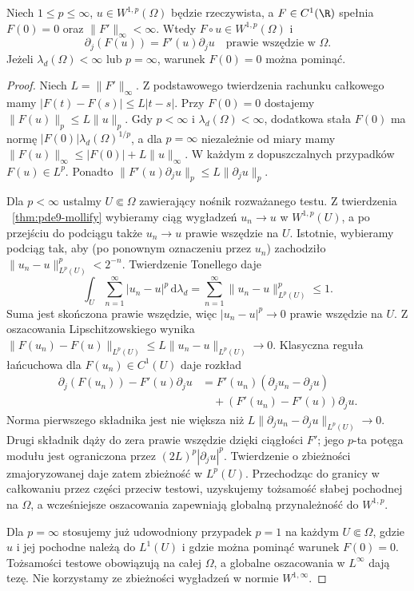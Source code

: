\begin{twierdzenie}
\label{thm:pde9-chain}
Niech $1\le p\le\infty$, $u\in W^{1,p}(\Omega)$
będzie rzeczywista, a $F\in C^1(\R)$ spełnia
$F(0)=0$ oraz $\|F'\|_\infty<\infty$.
Wtedy $F\circ u\in W^{1,p}(\Omega)$ i
\[
 \partial_j(F(u))=F'(u)\partial_j u
 \quad\text{prawie wszędzie w }\Omega.
\]
Jeżeli $\lambda_d(\Omega)<\infty$ lub $p=\infty$,
warunek $F(0)=0$ można pominąć.
\end{twierdzenie}
\begin{proof}
Niech $L=\|F'\|_\infty$. Z podstawowego twierdzenia
rachunku całkowego mamy $|F(t)-F(s)|\le L|t-s|$.
Przy $F(0)=0$ dostajemy $\|F(u)\|_p\le L\|u\|_p$.
Gdy $p<\infty$ i $\lambda_d(\Omega)<\infty$,
dodatkowa stała $F(0)$ ma normę
$|F(0)|\lambda_d(\Omega)^{1/p}$, a dla $p=\infty$
niezależnie od miary mamy $\|F(u)\|_\infty
\le |F(0)|+L\|u\|_\infty$.
W każdym z dopuszczalnych przypadków $F(u)\in L^p$.
Ponadto $\|F'(u)\partial_j u\|_p\le L\|\partial_j u\|_p$.

Dla $p<\infty$ ustalmy $U\Subset\Omega$ zawierający
nośnik rozważanego testu. Z twierdzenia
~\ref{thm:pde9-mollify} wybieramy ciąg wygładzeń
$u_n\to u$ w $W^{1,p}(U)$, a po przejściu
do podciągu także $u_n\to u$ prawie wszędzie na $U$.
Istotnie, wybieramy podciąg tak, aby (po ponownym
oznaczeniu przez $u_n$) zachodziło
$\|u_n-u\|_{L^p(U)}^p<2^{-n}$.
Twierdzenie Tonellego daje
\[
 \int_U\sum_{n=1}^\infty |u_n-u|^p\,\mathrm d\lambda_d
 =\sum_{n=1}^\infty\|u_n-u\|_{L^p(U)}^p\le1.
\]
Suma jest skończona prawie wszędzie, więc
$|u_n-u|^p\to0$ prawie wszędzie na $U$.
Z oszacowania Lipschitzowskiego wynika
$\|F(u_n)-F(u)\|_{L^p(U)}\le L\|u_n-u\|_{L^p(U)}\to0$.
Klasyczna reguła łańcuchowa dla $F(u_n)\in C^1(U)$
daje rozkład
\[
 \begin{aligned}
 \partial_j(F(u_n))-F'(u)\partial_j u
 &=F'(u_n)(\partial_j u_n-\partial_j u)\\
 &\quad +(F'(u_n)-F'(u))\partial_j u .
 \end{aligned}
\]
Norma pierwszego składnika jest nie większa niż
$L\|\partial_j u_n-\partial_j u\|_{L^p(U)}\to0$.
Drugi składnik dąży do zera prawie wszędzie
dzięki ciągłości $F'$; jego $p$-ta potęga modułu
jest ograniczona przez $(2L)^p|\partial_j u|^p$.
Twierdzenie o zbieżności zmajoryzowanej daje zatem
zbieżność w $L^p(U)$. Przechodząc do granicy
w całkowaniu przez części przeciw testowi,
uzyskujemy tożsamość słabej pochodnej na $\Omega$,
a wcześniejsze oszacowania zapewniają globalną
przynależność do $W^{1,p}$.

Dla $p=\infty$ stosujemy już udowodniony przypadek
$p=1$ na każdym $U\Subset\Omega$, gdzie $u$ i jej
pochodne należą do $L^1(U)$ i gdzie można pominąć
warunek $F(0)=0$. Tożsamości testowe obowiązują na całej
$\Omega$, a globalne oszacowania w $L^\infty$
dają tezę. Nie korzystamy ze zbieżności wygładzeń
w normie $W^{1,\infty}$.
\end{proof}

